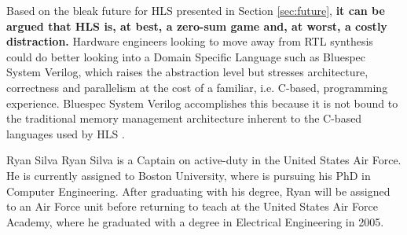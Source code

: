 \documentclass[12pt,journal,compsoc,onecolumn]{IEEEtran}
\begin{document}
Based on the bleak future for HLS presented in Section \ref{sec:future}, \textbf{it can be argued that HLS is, at best, a zero-sum game and, at worst, a costly distraction.} Hardware engineers looking to move away from RTL synthesis could do better looking into a Domain Specific Language such as Bluespec System Verilog, which raises the abstraction level but stresses architecture, correctness and parallelism at the cost of a familiar, i.e. C-based, programming experience\cite{bsv}. Bluespec System Verilog accomplishes this because it is not bound to the traditional memory management architecture inherent to the C-based languages used by HLS \cite{bluespec}.




\begin{IEEEbiography}{Ryan Silva}
	Ryan Silva is a Captain on active-duty in the United States Air Force. He is currently assigned to Boston University, where is pursuing his PhD in Computer Engineering. After graduating with his degree, Ryan will be assigned to an Air Force unit before returning to teach at the United States Air Force Academy, where he graduated with a degree in Electrical Engineering in 2005.
\end{IEEEbiography}
\end{document}
